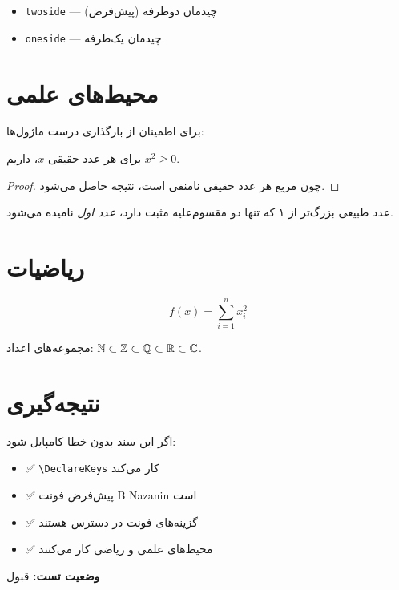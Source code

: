 \documentclass{matinbook}
\begin{document}
\begin{itemize}
    \item \verb|twoside| — چیدمان دوطرفه (پیش‌فرض)
    \item \verb|oneside| — چیدمان یک‌طرفه
\end{itemize}

\section{محیط‌های علمی}
\label{sec:environments}

برای اطمینان از بارگذاری درست ماژول‌ها:

\begin{theorem}
    برای هر عدد حقیقی $x$، داریم $x^2 \geq 0$.
\end{theorem}

\begin{proof}
    چون مربع هر عدد حقیقی نامنفی است، نتیجه حاصل می‌شود.
\end{proof}

\begin{definition}
    عدد طبیعی بزرگ‌تر از ۱ که تنها دو مقسوم‌علیه مثبت دارد،
    \emph{عدد اول} نامیده می‌شود.
\end{definition}

\section{ریاضیات}
\label{sec:math}

\begin{equation}
    \label{eq:options-test}
    f(x) = \sum_{i=1}^{n} x_i^2
\end{equation}

مجموعه‌های اعداد: $\mathbb{N} \subset \mathbb{Z} \subset \mathbb{Q} \subset \mathbb{R} \subset \mathbb{C}$.

\section{نتیجه‌گیری}
\label{sec:conclusion}

اگر این سند بدون خطا کامپایل شود:

\begin{itemize}
    \item ✅ \verb|\DeclareKeys| کار می‌کند
    \item ✅ پیش‌فرض فونت B Nazanin است
    \item ✅ گزینه‌های فونت در دسترس هستند
    \item ✅ محیط‌های علمی و ریاضی کار می‌کنند
\end{itemize}

\textbf{وضعیت تست:} قبول
\end{document}
